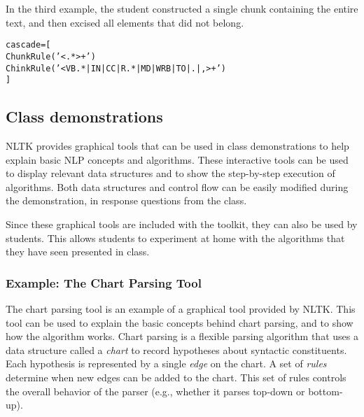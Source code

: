 \documentclass[11pt]{article}
\newenvironment{sv}{\scriptsize\begin{alltt}}{\end{alltt}\normalsize}
\begin{document}
In the third example, the student constructed a single chunk
containing the entire text, and then excised all elements that did not
belong.

\begin{sv}
cascade = [
  ChunkRule('<.*>+')
  ChinkRule('<VB.*|IN|CC|R.*|MD|WRB|TO|.|,>+')
]
\end{sv}


%

\subsection{Class demonstrations}

NLTK provides graphical tools that can be used in class demonstrations
to help explain basic NLP concepts and algorithms.  These interactive
tools can be used to display relevant data structures and to show the
step-by-step execution of algorithms.  Both data structures and
control flow can be easily modified during the demonstration, in
response questions from the class.

Since these graphical tools are included with the toolkit, they can
also be used by students.  This allows students to experiment at home
with the algorithms that they have seen presented in class.

\subsubsection*{Example: The Chart Parsing Tool}

The chart parsing tool is an example of a graphical tool provided by
NLTK.  This tool can be used to explain the basic concepts behind
chart parsing, and to show how the algorithm works.  Chart parsing is
a flexible parsing algorithm that uses a data structure called a
\emph{chart} to record hypotheses about syntactic constituents.  Each
hypothesis is represented by a single \emph{edge} on the chart.  A set
of \emph{rules} determine when new edges can be added to the chart.
This set of rules controls the overall behavior of the parser (e.g.,
whether it parses top-down or bottom-up).
\end{document}
